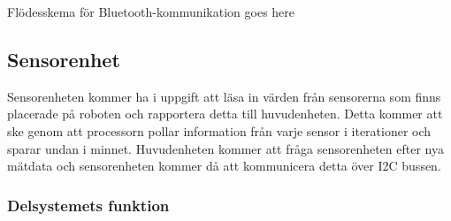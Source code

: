 \documentclass{article}
\begin{document}
Flödesskema för Bluetooth-kommunikation goes here

\clearpage

\subsection{Sensorenhet}
Sensorenheten kommer ha i uppgift att läsa in värden från sensorerna som finns placerade på roboten och rapportera detta till huvudenheten. Detta kommer att ske genom att processorn pollar information från varje sensor i iterationer och sparar undan i minnet. Huvudenheten kommer att fråga sensorenheten efter nya mätdata och sensorenheten kommer då att kommunicera detta över I2C bussen.

\subsubsection{Delsystemets funktion}
\end{document}
